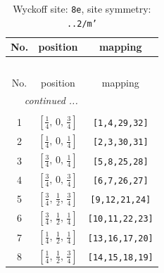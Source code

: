 \documentclass[fleqn,8pt]{jsarticle}
\begin{document}
\begin{longtable}{ccc}
\caption{Wyckoff site: {\tt 8e}, site symmetry: {\tt ..2/m'}}
 \\
 \hline \hline
No. & position & mapping \\ \hline \endfirsthead

\multicolumn{2}{l}{\tablename\ \thetable{}} \\
 \hline \hline
No. & position & mapping \\ \hline \endhead

 \hline \hline
\multicolumn{2}{r}{\footnotesize\it continued ...} \\ \endfoot

 \hline \hline
\multicolumn{2}{r}{} \\ \endlastfoot

1 & $\left[ \frac{1}{4},\, 0,\, \frac{3}{4} \right]$ & {\tt [1,4,29,32]} \\ \hline
2 & $\left[ \frac{1}{4},\, 0,\, \frac{1}{4} \right]$ & {\tt [2,3,30,31]} \\ \hline
3 & $\left[ \frac{3}{4},\, 0,\, \frac{1}{4} \right]$ & {\tt [5,8,25,28]} \\ \hline
4 & $\left[ \frac{3}{4},\, 0,\, \frac{3}{4} \right]$ & {\tt [6,7,26,27]} \\ \hline
5 & $\left[ \frac{3}{4},\, \frac{1}{2},\, \frac{3}{4} \right]$ & {\tt [9,12,21,24]} \\ \hline
6 & $\left[ \frac{3}{4},\, \frac{1}{2},\, \frac{1}{4} \right]$ & {\tt [10,11,22,23]} \\ \hline
7 & $\left[ \frac{1}{4},\, \frac{1}{2},\, \frac{1}{4} \right]$ & {\tt [13,16,17,20]} \\ \hline
8 & $\left[ \frac{1}{4},\, \frac{1}{2},\, \frac{3}{4} \right]$ & {\tt [14,15,18,19]} \\
\end{longtable}
\renewcommand{\arraystretch}{1.2}
\end{document}
